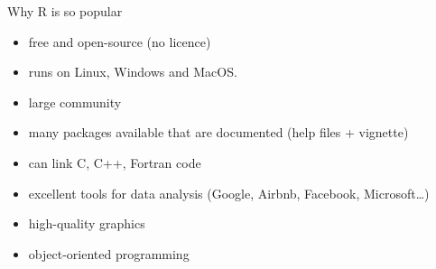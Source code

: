 \documentclass[8pt,ignorenonframetext,]{beamer}
\providecommand{\tightlist}{%
  \setlength{\itemsep}{0pt}\setlength{\parskip}{0pt}}
\begin{document}
\begin{frame}{Why R is so popular}

\begin{itemize}
\tightlist
\item
  free and open-source (no licence)
\item
  runs on Linux, Windows and MacOS.
\item
  large community
\item
  many packages available that are documented (help files + vignette)
\item
  can link C, C++, Fortran code
\item
  excellent tools for data analysis (Google, Airbnb, Facebook,
  Microsoft\ldots{})
\item
  high-quality graphics
\item
  object-oriented programming
\end{itemize}

\end{frame}
\end{document}
